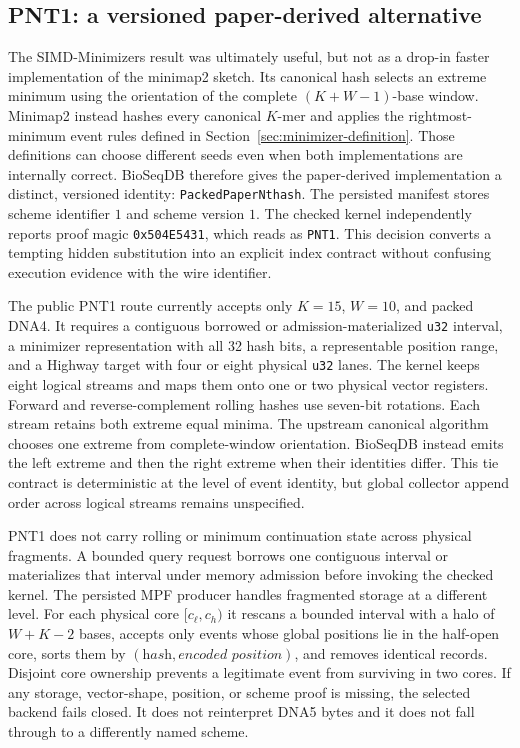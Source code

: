\subsection{PNT1: a versioned paper-derived alternative}
\label{sec:pnt1}

The SIMD-Minimizers result was ultimately useful, but not as a drop-in faster
implementation of the minimap2 sketch.  Its canonical hash selects an extreme
minimum using the orientation of the complete $(K+W-1)$-base window. Minimap2
instead hashes every canonical $K$-mer and applies the rightmost-minimum event
rules defined in Section~\ref{sec:minimizer-definition}.  Those definitions
can choose different seeds even
when both implementations are internally correct.  BioSeqDB therefore gives
the paper-derived implementation a distinct, versioned identity:
\texttt{PackedPaperNthash}. The persisted manifest stores scheme identifier
$1$ and scheme version $1$. The checked kernel independently reports proof
magic \texttt{0x504E5431}, which reads as \texttt{PNT1}. This decision converts
a tempting hidden substitution into an explicit index contract without
confusing execution evidence with the wire identifier.

The public PNT1 route currently accepts only $K=15$, $W=10$, and packed DNA4.
It requires a contiguous borrowed or admission-materialized \texttt{u32}
interval, a minimizer representation with all 32 hash bits, a representable
position range, and a Highway target with four or eight physical \texttt{u32}
lanes. The kernel keeps eight logical streams and maps them onto one or two
physical vector registers. Forward and reverse-complement rolling hashes use seven-bit
rotations. Each stream retains both extreme equal minima. The upstream
canonical algorithm chooses one extreme from complete-window orientation.
BioSeqDB instead emits the left extreme and then the right extreme when their
identities differ. This tie contract is deterministic at the level of event
identity, but global collector append order across logical streams remains
unspecified.

PNT1 does not carry rolling or minimum continuation state across physical
fragments. A bounded query request borrows one contiguous interval or
materializes that interval under memory admission before invoking the checked
kernel. The persisted MPF producer handles fragmented storage at a different
level. For each physical core $[c_\ell,c_h)$ it rescans a bounded interval with
a halo of $W+K-2$ bases, accepts only events whose global positions lie in the
half-open core, sorts them by $(\textit{hash},\textit{encoded position})$, and
removes identical records. Disjoint core ownership prevents a legitimate
event from surviving in two cores. If any storage, vector-shape, position, or
scheme proof is missing, the selected backend fails closed. It does not
reinterpret DNA5 bytes and it does not fall through to a differently named
scheme.

